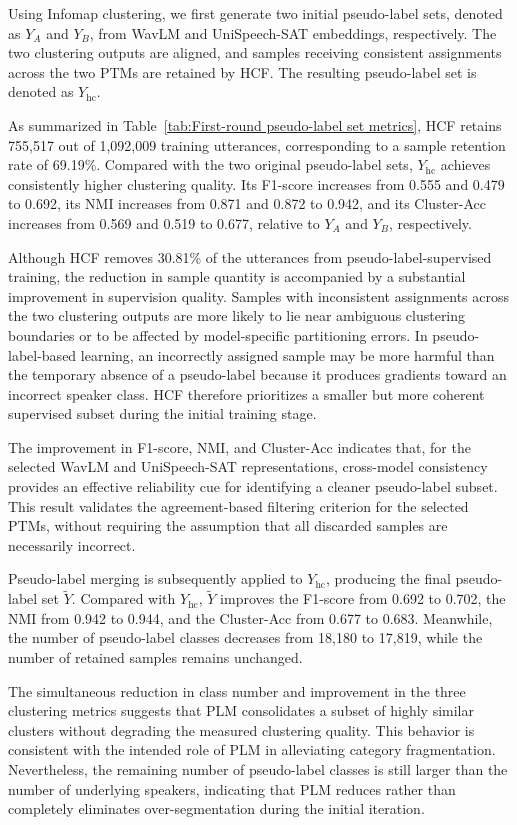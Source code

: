 \documentclass[lettersize,journal]{IEEEtran}
\begin{document}
Using Infomap clustering, we first generate two initial pseudo-label
sets, denoted as $Y_A$ and $Y_B$, from WavLM and UniSpeech-SAT
embeddings, respectively. The two clustering outputs are aligned, and
samples receiving consistent assignments across the two PTMs are
retained by HCF. The resulting pseudo-label set is denoted as
$Y_{\mathrm{hc}}$.

As summarized in
Table~\ref{tab:First-round pseudo-label set metrics}, HCF retains
755,517 out of 1,092,009 training utterances, corresponding to a
sample retention rate of 69.19\%. Compared with the two original
pseudo-label sets, $Y_{\mathrm{hc}}$ achieves consistently higher
clustering quality. Its F1-score increases from 0.555 and 0.479 to
0.692, its NMI increases from 0.871 and 0.872 to 0.942, and its
Cluster-Acc increases from 0.569 and 0.519 to 0.677, relative to
$Y_A$ and $Y_B$, respectively.

Although HCF removes 30.81\% of the utterances from
pseudo-label-supervised training, the reduction in sample quantity is
accompanied by a substantial improvement in supervision quality.
Samples with inconsistent assignments across the two clustering
outputs are more likely to lie near ambiguous clustering boundaries
or to be affected by model-specific partitioning errors. In
pseudo-label-based learning, an incorrectly assigned sample may be
more harmful than the temporary absence of a pseudo-label because it
produces gradients toward an incorrect speaker class. HCF therefore
prioritizes a smaller but more coherent supervised subset during the
initial training stage.

The improvement in F1-score, NMI, and Cluster-Acc indicates that,
for the selected WavLM and UniSpeech-SAT representations,
cross-model consistency provides an effective reliability cue for
identifying a cleaner pseudo-label subset. This result validates the
agreement-based filtering criterion for the selected PTMs, without
requiring the assumption that all discarded samples are necessarily
incorrect.

Pseudo-label merging is subsequently applied to
$Y_{\mathrm{hc}}$, producing the final pseudo-label set
$\tilde{Y}$. Compared with $Y_{\mathrm{hc}}$, $\tilde{Y}$ improves
the F1-score from 0.692 to 0.702, the NMI from 0.942 to 0.944, and
the Cluster-Acc from 0.677 to 0.683. Meanwhile, the number of
pseudo-label classes decreases from 18,180 to 17,819, while the
number of retained samples remains unchanged.

The simultaneous reduction in class number and improvement in the
three clustering metrics suggests that PLM consolidates a subset of
highly similar clusters without degrading the measured clustering
quality. This behavior is consistent with the intended role of PLM
in alleviating category fragmentation. Nevertheless, the remaining
number of pseudo-label classes is still larger than the number of
underlying speakers, indicating that PLM reduces rather than
completely eliminates over-segmentation during the initial
iteration.
\end{document}
